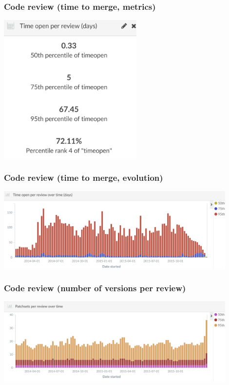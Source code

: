 \documentclass[17pt,aspectratio=169,hyperref=pdfusetitle]{beamer}
\begin{document}
\begin{frame}
\frametitle{Code review (time to merge, metrics)}

\begin{center}
  \includegraphics[height=7.5cm]{figs/timeopen-review-metrics}
\end{center}

\end{frame}


\begin{frame}
\frametitle{Code review (time to merge, evolution)}

\begin{center}
  \includegraphics[width=12cm]{figs/timeopen-review}
\end{center}

\end{frame}


\begin{frame}
\frametitle{Code review (number of versions per review)}

\begin{center}
  \includegraphics[width=12cm]{figs/patchsets-per-review}
\end{center}

\end{frame}
\end{document}
